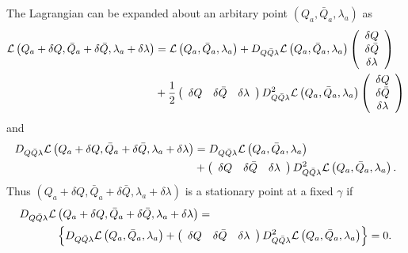 \documentclass[aps,preprint]{revtex4}%
\begin{document}
The Lagrangian can be expanded about an arbitary point $\left(  Q_{a},\bar
{Q}_{a},\lambda_{a}\right)  $ as
\begin{align}
\mathcal{L}\left(  Q_{a}+\delta Q,\bar{Q}_{a}+\delta\bar{Q},\lambda_{a}%
+\delta\lambda\right)   &  =\mathcal{L}\left(  Q_{a},\bar{Q}_{a},\lambda
_{a}\right)  +D_{Q\bar{Q}\lambda}\mathcal{L}\left(  Q_{a},\bar{Q}_{a}%
,\lambda_{a}\right)  \left(
\begin{array}
[c]{c}%
\delta Q\\
\delta\bar{Q}\\
\delta\lambda
\end{array}
\right) \nonumber\\
&  +\frac{1}{2}\left(
\begin{array}
[c]{ccc}%
\delta Q & \delta\bar{Q} & \delta\lambda
\end{array}
\right)  D_{Q\bar{Q}\lambda}^{2}\mathcal{L}\left(  Q_{a},\bar{Q}_{a}%
,\lambda_{a}\right)  \left(
\begin{array}
[c]{c}%
\delta Q\\
\delta\bar{Q}\\
\delta\lambda
\end{array}
\right)
\end{align}
and
\begin{align}
D_{Q\bar{Q}\lambda}\mathcal{L}\left(  Q_{a}+\delta Q,\bar{Q}_{a}+\delta\bar
{Q},\lambda_{a}+\delta\lambda\right)   &  =D_{Q\bar{Q}\lambda}\mathcal{L}%
\left(  Q_{a},\bar{Q}_{a},\lambda_{a}\right) \\
&  +\left(
\begin{array}
[c]{ccc}%
\delta Q & \delta\bar{Q} & \delta\lambda
\end{array}
\right)  D_{Q\bar{Q}\lambda}^{2}\mathcal{L}\left(  Q_{a},\bar{Q}_{a}%
,\lambda_{a}\right)  .
\end{align}
Thus $\left(  Q_{a}+\delta Q,\bar{Q}_{a}+\delta\bar{Q},\lambda_{a}%
+\delta\lambda\right)  $ is a stationary point at a fixed $\gamma$ if
\begin{align}
D_{Q\bar{Q}\lambda}\mathcal{L}  &  \left(  Q_{a}+\delta Q,\bar{Q}_{a}%
+\delta\bar{Q},\lambda_{a}+\delta\lambda\right)  =\label{NR}\\
&  \left\{  D_{Q\bar{Q}\lambda}\mathcal{L}\left(  Q_{a},\bar{Q}_{a}%
,\lambda_{a}\right)  +\left(
\begin{array}
[c]{ccc}%
\delta Q & \delta\bar{Q} & \delta\lambda
\end{array}
\right)  D_{Q\bar{Q}\lambda}^{2}\mathcal{L}\left(  Q_{a},\bar{Q}_{a}%
,\lambda_{a}\right)  \right\}  =0.
\end{align}
\end{document}
